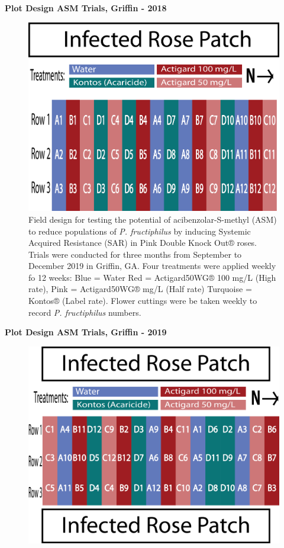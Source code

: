 \documentclass[12pt,final,CPage]{ufthesis}
\begin{document}
{  \textbf{Plot Design ASM Trials, Griffin - 2018}
  \begin{figure}

  {\centering \includegraphics[width=0.8\linewidth]{figure/rrv_asm_plot_2018_griffin} 

  }

  \caption[Field design for testing the potential of acibenzolar-S-methyl (ASM) to reduce populations of \textit{P. fructiphilus}]{Field design for testing the potential of acibenzolar-S-methyl (ASM) to reduce populations of \textit{P. fructiphilus} by inducing Systemic Acquired Resistance (SAR) in Pink Double Knock Out® roses. Trials were conducted for three months from September to December 2019 in Griffin, GA. Four treatments were applied weekly fo 12 weeks: Blue = Water Red = Actigard50WG® 100 \si{\milli\gram}/L (High rate),  Pink = Actigard50WG® \si{\milli\gram}/L (Half rate) Turquoise = Kontos® (Label rate). Flower cuttings were be taken weekly to record \textit{P. fructiphilus} numbers.}\label{fig:grif-asm-2018}
  \end{figure}
  \textbf{Plot Design ASM Trials, Griffin - 2019}
  \begin{figure}

  {\centering \includegraphics[width=0.8\linewidth]{figure/rrv_asm_plot_2019_griffin} 

}
\end{figure}}
\end{document}
